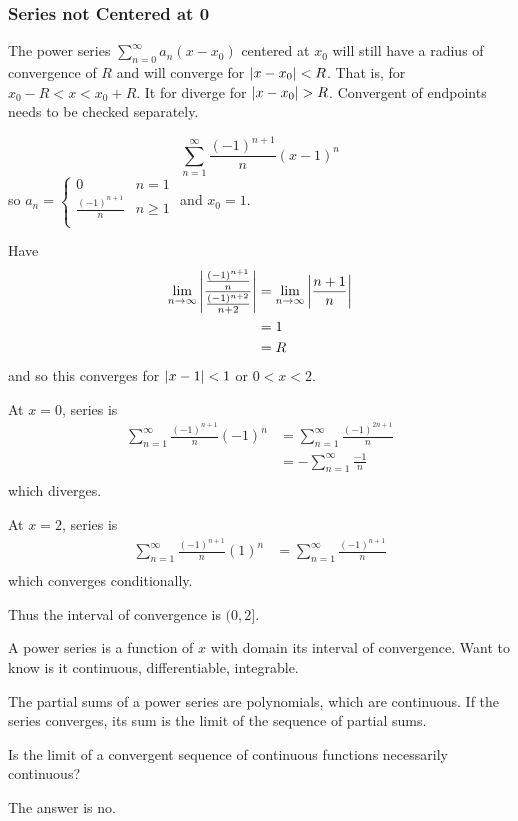 \documentclass{article}
\begin{document}
\subsubsection{Series not Centered at 0}
\begin{definition}
  The power series $\sum_{n=0}^\infty a_n(x-x_0)$ centered at $x_0$ will still have a radius of convergence of $R$ and will converge for $\abs{x-x_0} < R$. That is, for $x_0 - R < x < x_0 + R$. It for diverge for $\abs{x-x_0} > R$. Convergent of endpoints needs to be checked separately.
\end{definition}
\begin{example}
  \[
    \sum_{n=1}^\infty \frac{(-1)^{n+1}}{n} (x-1)^n
  \] so $a_n =
  \begin{cases}
    0 & n=1\\
    \frac{(-1)^{n+1}}{n} & n \geq 1\\
  \end{cases}$ and $x_0 = 1$.

  Have
  \begin{align*}
    \lim_{n\to\infty} \abs{\frac{\frac{(-1)^{n+1}}{n}}{\frac{(-1)^{n+2}}{n+2}}} &= \lim_{n\to\infty} \abs{\frac{n+1}{n}}\\
    &= 1\\
    &= R\\
  \end{align*} and so this converges for $\abs{x-1} < 1$ or $0 < x < 2$.

  At $x=0$, series is
  \begin{align*}
    \sum_{n=1}^\infty \frac{(-1)^{n+1}}{n} (-1)^n &= \sum_{n=1}^\infty \frac{(-1)^{2n+1}}{n}\\
    &= -\sum_{n=1}^\infty \frac{-1}{n}\\
  \end{align*} which diverges.

  At $x=2$, series is
  \begin{align*}
    \sum_{n=1}^\infty \frac{(-1)^{n+1}}{n} (1)^n &= \sum_{n=1}^\infty \frac{(-1)^{n+1}}{n}\\
  \end{align*} which converges conditionally.

  Thus the interval of convergence is $(0, 2]$.
\end{example}
\begin{remark}
  A power series is a function of $x$ with domain its interval of convergence. Want to know is it continuous, differentiable, integrable.

  The partial sums of a power series are polynomials, which are continuous. If the series converges, its sum is the limit of the sequence of partial sums.

  Is the limit of a convergent sequence of continuous functions necessarily continuous?

  The answer is no.
\end{remark}
\end{document}
